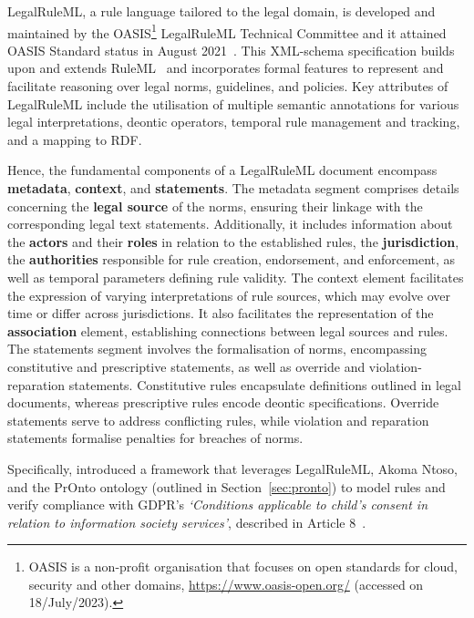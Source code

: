 LegalRuleML, a rule language tailored to the legal domain, is developed and maintained by the OASIS\footnote{OASIS is a non-profit organisation that focuses on open standards for cloud, security and other domains, \url{https://www.oasis-open.org/} (accessed on 18/July/2023).} LegalRuleML Technical Committee and it attained OASIS Standard status in August 2021~\citep{palmirani_legalruleml_2021}.
This XML-schema specification builds upon and extends RuleML~\citep{boley_specification_2017} and incorporates formal features to represent and facilitate reasoning over legal norms, guidelines, and policies.
Key attributes of LegalRuleML include the utilisation of multiple semantic annotations for various legal interpretations, deontic operators, temporal rule management and tracking, and a mapping to RDF.

Hence, the fundamental components of a LegalRuleML document encompass \textbf{metadata}, \textbf{context}, and \textbf{statements}. 
The metadata segment comprises details concerning the \textbf{legal source} of the norms, ensuring their linkage with the corresponding legal text statements.
Additionally, it includes information about the \textbf{actors} and their \textbf{roles} in relation to the established rules, the \textbf{jurisdiction}, the \textbf{authorities} responsible for rule creation, endorsement, and enforcement, as well as temporal parameters defining rule validity.
The context element facilitates the expression of varying interpretations of rule sources, which may evolve over time or differ across jurisdictions.
It also facilitates the representation of the \textbf{association} element, establishing connections between legal sources and rules.
The statements segment involves the formalisation of norms, encompassing constitutive and prescriptive statements, as well as override and violation-reparation statements.
Constitutive rules encapsulate definitions outlined in legal documents, whereas prescriptive rules encode deontic specifications.
Override statements serve to address conflicting rules, while violation and reparation statements formalise penalties for breaches of norms.

Specifically, \cite{palmirani_modelling_2018} introduced a framework that leverages LegalRuleML, Akoma Ntoso, and the PrOnto ontology (outlined in Section~\ref{sec:pronto}) to model rules and verify compliance with GDPR's \textit{`Conditions applicable to child's consent in relation to information society services'}, described in Article 8~\citeyearpar{noauthor_regulation_2016}.

